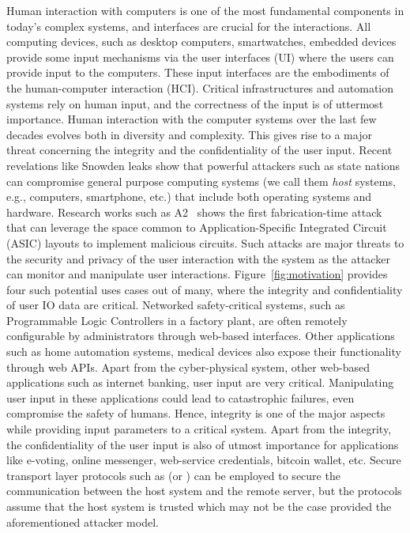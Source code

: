 Human interaction with computers is one of the most fundamental components in today's complex systems, and interfaces are crucial for the interactions. All computing devices, such as desktop computers, smartwatches, embedded devices provide some input mechanisms via the user interfaces (UI) where the users can provide input to the computers. These input interfaces are the embodiments of the human-computer interaction (HCI). Critical infrastructures and automation systems rely on human input, and the correctness of the input is of uttermost importance. Human interaction with the computer systems over the last few decades evolves both in diversity and complexity. This gives rise to a major threat concerning the integrity and the confidentiality of the user input. Recent revelations like Snowden leaks show that powerful attackers such as state nations can compromise general purpose computing systems (we call them \emph{host} systems, e.g., computers, smartphone, etc.) that include both operating systems and hardware. Research works such as A2~\cite{A2} shows the first fabrication-time attack that can leverage the space common to Application-Specific Integrated Circuit (ASIC) layouts to implement malicious circuits. Such attacks are major threats to the security and privacy of the user interaction with the system as the attacker can monitor and manipulate user interactions. 
Figure~\ref{fig:motivation} provides four such potential uses cases out of many, where the integrity and confidentiality of user IO data are critical. Networked safety-critical systems, such as Programmable Logic Controllers in a factory plant, are often remotely configurable by administrators through web-based interfaces. Other applications such as home automation systems, medical devices also expose their functionality through web APIs. Apart from the cyber-physical system, other web-based applications such as internet banking, user input are very critical. Manipulating user input in these applications could lead to catastrophic failures, even compromise the safety of humans. Hence, integrity is one of the major aspects while providing input parameters to a critical system. Apart from the integrity, the confidentiality of the user input is also of utmost importance for applications like e-voting, online messenger, web-service credentials, bitcoin wallet, etc. Secure transport layer protocols such as \https (or \tls) can be employed to secure the communication between the host system and the remote server, but the protocols assume that the host system is trusted which may not be the case provided the aforementioned attacker model.

